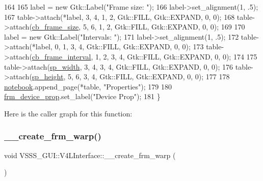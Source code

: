 \begin{DoxyCode}
164 
165         label = \textcolor{keyword}{new} Gtk::Label(\textcolor{stringliteral}{"Frame size: "});
166         label->set\_alignment(1, .5);
167         table->attach(*label, 3, 4, 1, 2, Gtk::FILL, Gtk::EXPAND, 0, 0);
168         table->attach(\hyperlink{class_v_s_s_s___g_u_i_1_1_v4_l_interface_ad6dd4704d3b7d1f262843dd148269b73}{cb\_frame\_size}, 5, 6, 1, 2, Gtk::FILL, Gtk::EXPAND, 0, 0);
169 
170         label = \textcolor{keyword}{new} Gtk::Label(\textcolor{stringliteral}{"Intervals: "});
171         label->set\_alignment(1, .5);
172         table->attach(*label, 0, 1, 3, 4, Gtk::FILL, Gtk::EXPAND, 0, 0);
173         table->attach(\hyperlink{class_v_s_s_s___g_u_i_1_1_v4_l_interface_ad07b3bbad672e676e128f19a12f07e73}{cb\_frame\_interval}, 1, 2, 3, 4, Gtk::FILL, Gtk::EXPAND, 0, 0);
174 
175         table->attach(\hyperlink{class_v_s_s_s___g_u_i_1_1_v4_l_interface_a0f492cb2c65c4021c9b9b81f4a185e84}{sp\_width}, 3, 4, 3, 4, Gtk::FILL, Gtk::EXPAND, 0, 0);
176         table->attach(\hyperlink{class_v_s_s_s___g_u_i_1_1_v4_l_interface_a7b095a3a9dc7a5895f3bac68b05b8210}{sp\_height}, 5, 6, 3, 4, Gtk::FILL, Gtk::EXPAND, 0, 0);
177 
178         \hyperlink{class_v_s_s_s___g_u_i_1_1_v4_l_interface_a658017c295c18a779272aa6182664da5}{notebook}.append\_page(*table, \textcolor{stringliteral}{"Properties"});
179 
180         \hyperlink{class_v_s_s_s___g_u_i_1_1_v4_l_interface_a5f4e313c287e18402de5918558a3f33e}{frm\_device\_prop}.set\_label(\textcolor{stringliteral}{"Device Prop"});
181     \}
\end{DoxyCode}
Here is the caller graph for this function\+:
\mbox{\label{class_v_s_s_s___g_u_i_1_1_v4_l_interface_a3a93979f5fe811ca90616e568a6df989}} 
\subsubsection{\texorpdfstring{\+\_\+\+\_\+create\+\_\+frm\+\_\+warp()}{\_\_create\_frm\_warp()}}
{\footnotesize\ttfamily void V\+S\+S\+S\+\_\+\+G\+U\+I\+::\+V4\+L\+Interface\+::\+\_\+\+\_\+create\+\_\+frm\+\_\+warp (\begin{DoxyParamCaption}{ }\end{DoxyParamCaption})\hspace{0.3cm}{\ttfamily [private]}}



